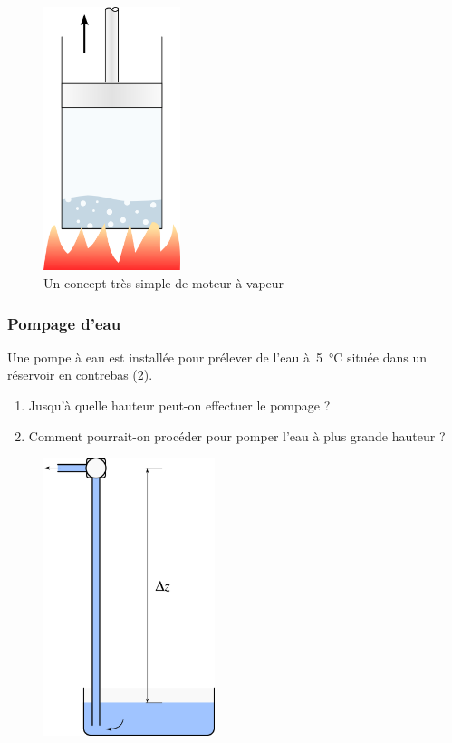 	\begin{figure}[htp] %
		\begin{center}
			\includegraphics[width=4cm]{images/exercice_moteur_simple.png}
		\end{center}
		\caption{Un concept très simple de moteur à vapeur}
		\label{fig_moteurvapeursimple}
	\end{figure}

\subsubsection{Pompage d’eau}

	Une pompe à eau est installée pour prélever de l’eau à~\SI{5}{\degreeCelsius} située dans un réservoir en contrebas (\cref{fig_pompage}). 
	
	\begin{enumerate}
		\item Jusqu’à quelle hauteur peut-on effectuer le pompage ?	
		\item Comment pourrait-on procéder pour pomper l’eau à plus grande hauteur ?
	\end{enumerate}

	\begin{figure}[htp] %
		\begin{center}
			\includegraphics[width=5cm]{images/exercice_pompe_eau.png}
		\end{center}
		\label{fig_pompage}
	\end{figure}




